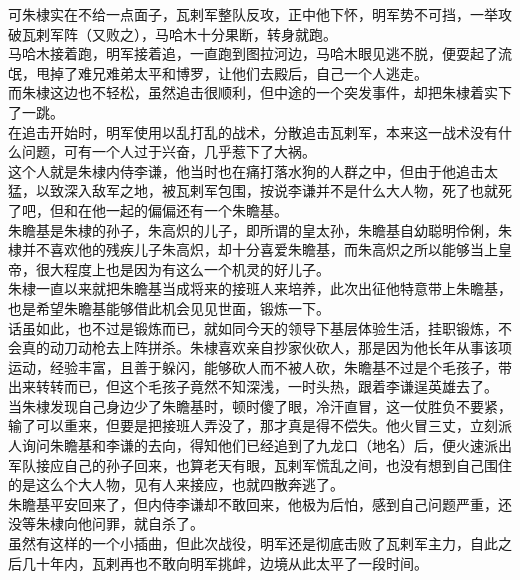 \begin{multicols}{\theparacolNo}
可朱棣实在不给一点面子，瓦剌军整队反攻，正中他下怀，明军势不可挡，一举攻破瓦剌军阵（又败之），马哈木十分果断，转身就跑。\\

马哈木接着跑，明军接着追，一直跑到图拉河边，马哈木眼见逃不脱，便耍起了流氓，甩掉了难兄难弟太平和博罗，让他们去殿后，自己一个人逃走。\\

而朱棣这边也不轻松，虽然追击很顺利，但中途的一个突发事件，却把朱棣着实下了一跳。\\

在追击开始时，明军使用以乱打乱的战术，分散追击瓦剌军，本来这一战术没有什么问题，可有一个人过于兴奋，几乎惹下了大祸。\\

这个人就是朱棣内侍李谦，他当时也在痛打落水狗的人群之中，但由于他追击太猛，以致深入敌军之地，被瓦剌军包围，按说李谦并不是什么大人物，死了也就死了吧，但和在他一起的偏偏还有一个朱瞻基。\\

朱瞻基是朱棣的孙子，朱高炽的儿子，即所谓的皇太孙，朱瞻基自幼聪明伶俐，朱棣并不喜欢他的残疾儿子朱高炽，却十分喜爱朱瞻基，而朱高炽之所以能够当上皇帝，很大程度上也是因为有这么一个机灵的好儿子。\\

朱棣一直以来就把朱瞻基当成将来的接班人来培养，此次出征他特意带上朱瞻基，也是希望朱瞻基能够借此机会见见世面，锻炼一下。\\

话虽如此，也不过是锻炼而已，就如同今天的领导下基层体验生活，挂职锻炼，不会真的动刀动枪去上阵拼杀。朱棣喜欢亲自抄家伙砍人，那是因为他长年从事该项运动，经验丰富，且善于躲闪，能够砍人而不被人砍，朱瞻基不过是个毛孩子，带出来转转而已，但这个毛孩子竟然不知深浅，一时头热，跟着李谦逞英雄去了。\\

当朱棣发现自己身边少了朱瞻基时，顿时傻了眼，冷汗直冒，这一仗胜负不要紧，输了可以重来，但要是把接班人弄没了，那才真是得不偿失。他火冒三丈，立刻派人询问朱瞻基和李谦的去向，得知他们已经追到了九龙口（地名）后，便火速派出军队接应自己的孙子回来，也算老天有眼，瓦剌军慌乱之间，也没有想到自己围住的是这么个大人物，见有人来接应，也就四散奔逃了。\\

朱瞻基平安回来了，但内侍李谦却不敢回来，他极为后怕，感到自己问题严重，还没等朱棣向他问罪，就自杀了。\\

虽然有这样的一个小插曲，但此次战役，明军还是彻底击败了瓦剌军主力，自此之后几十年内，瓦剌再也不敢向明军挑衅，边境从此太平了一段时间。\\


\end{multicols}
